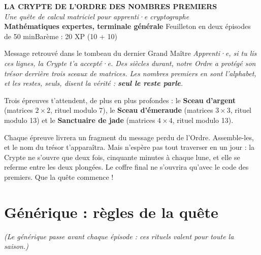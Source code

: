 \documentclass[11pt,a4paper]{article}
\begin{document}
	
	\begin{center}
		{\LARGE\bfseries\textcolor{nuit}{LA CRYPTE DE L'ORDRE DES NOMBRES PREMIERS}}\\[2mm]
		{\large\itshape Une quête de calcul matriciel pour apprenti·e cryptographe}\\[2mm]
		\textbf{Mathématiques expertes, terminale générale}\quad\textbullet\quad
		Feuilleton en deux épisodes de 50 min\quad\textbullet\quad Barème : 20 XP (10 + 10)
	\end{center}
	
	\vspace{1mm}
	\begin{missive}{Message retrouvé dans le tombeau du dernier Grand Maître}
		\itshape
		Apprenti·e, si tu lis ces lignes, la Crypte t'a accepté·e.
		Des siècles durant, notre Ordre a protégé son trésor derrière trois sceaux
		de matrices. Les nombres premiers en sont l'alphabet, et les restes,
		seuls, disent la vérité : \textbf{seul le reste parle}.
		
		Trois épreuves t'attendent, de plus en plus profondes :
		le \textcolor{argent}{\textbf{Sceau d'argent}} (matrices $2\times 2$, rituel modulo 7),
		le \textcolor{emeraude}{\textbf{Sceau d'émeraude}} (matrices $3\times 3$, rituel modulo 13)
		et le \textcolor{jade}{\textbf{Sanctuaire de jade}} (matrices $4\times 4$, rituel modulo 13).
		
		Chaque épreuve livrera un fragment du message perdu de l'Ordre.
		Assemble-les, et le nom du trésor t'apparaîtra. Mais n'espère pas tout
		traverser en un jour : la Crypte ne s'ouvre que deux fois, cinquante
		minutes à chaque lune, et elle se referme entre les deux plongées.
		Le coffre final ne s'ouvrira qu'avec le code des premiers.
		Que la quête commence !
	\end{missive}
	
	\section*{\textcolor{nuit}{Générique : règles de la quête}}
	
	{\small\itshape (Le générique passe avant chaque épisode : ces rituels
		valent pour toute la saison.)}
	
\end{document}
